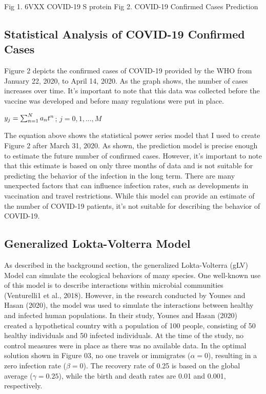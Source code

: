 Fig 1. 6VXX COVID-19 S protein \hspace{5mm}Fig 2. COVID-19 Confirmed Cases Prediction

\subsection{Statistical Analysis of COVID-19 Confirmed Cases}
\hspace{5mm} Figure 2 depicts the confirmed cases of COVID-19 provided by the WHO from January 22, 2020, to April 14, 2020. As the graph shows, the number of cases increases over time. It's important to note that this data was collected before the vaccine was developed and before many regulations were put in place.

\begin{center}
    \Large$\large y_j = \sum_{n=1}^N a_nt^n$; $j = 0,1,...,M$
\end{center}

The equation above shows the statistical power series model that I used to create Figure 2 after March 31, 2020. As shown, the prediction model is precise enough to estimate the future number of confirmed cases. However, it's important to note that this estimate is based on only three months of data and is not suitable for predicting the behavior of the infection in the long term. There are many unexpected factors that can influence infection rates, such as developments in vaccination and travel restrictions. While this model can provide an estimate of the number of COVID-19 patients, it's not suitable for describing the behavior of COVID-19.

\pagebreak
\subsection{Generalized Lokta-Volterra Model}
\hspace{5mm} As described in the background section, the generalized Lokta-Volterra (gLV) Model can simulate the ecological behaviors of many species. One well-known use of this model is to describe interactions within microbial communities (Venturelli1 et al., 2018). However, in the research conducted by Younes and Hasan (2020), the model was used to simulate the interactions between healthy and infected human populations. In their study, Younes and Hasan (2020) created a hypothetical country with a population of 100 people, consisting of 50 healthy individuals and 50 infected individuals. At the time of the study, no control measures were in place as there was no available data. In the optimal solution shown in Figure 03, no one travels or immigrates ($\alpha = 0$), resulting in a zero infection rate ($\beta = 0$). The recovery rate of 0.25 is based on the global average ($\gamma = 0.25$), while the birth and death rates are 0.01 and 0.001, respectively.

